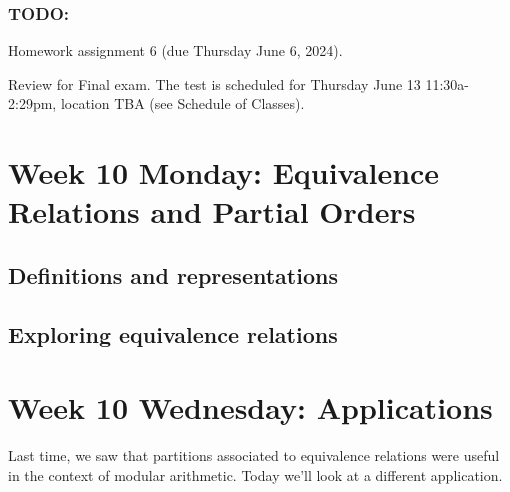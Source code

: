 \subsubsection*{TODO:}
\begin{list}
   {\itemsep2pt}
   \item Homework assignment 6 (due Thursday June 6, 2024).
   \item Review for Final exam. The test is scheduled for Thursday June 13 11:30a-2:29pm, location TBA (see Schedule of Classes).
\end{list}

\newpage
\section*{Week 10 Monday: Equivalence Relations and Partial Orders}
\subsection*{Definitions and representations}



\vfill

\vfill
\newpage
\subsection*{Exploring equivalence relations}



\vfill

\vfill
\newpage


\vfill

\vfill
\newpage

\vfill
\newpage

\newpage
\section*{Week 10 Wednesday: Applications}



Last time, we saw that partitions associated to equivalence relations
were useful in the context of modular arithmetic.
Today we'll look at a different application.




